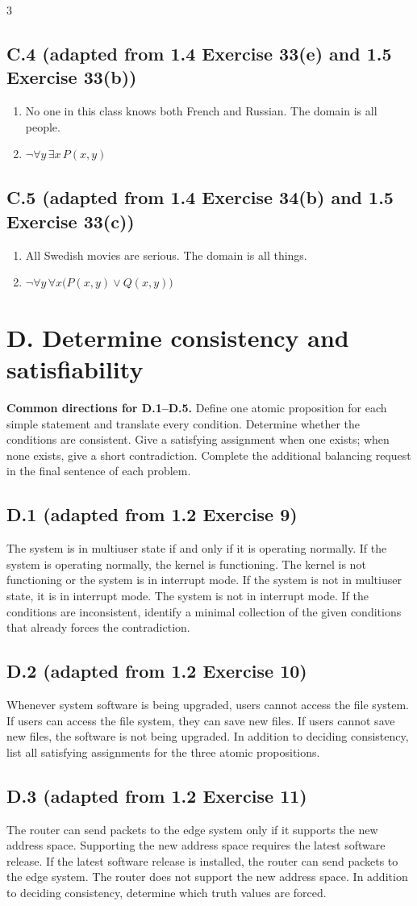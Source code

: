 \documentclass{article}
\newcommand{\problem}[2]{%
  \par
  \subsection*{#1 {\normalfont\footnotesize (#2)}}%
}
\begin{document}
\begin{multicols}{3}
\problem{C.4}{adapted from 1.4 Exercise 33(e) and 1.5 Exercise 33(b)}
\begin{enumerate}[label=(\alph*)]
  \item No one in this class knows both French and Russian. The domain is all
        people.
  \item $\neg\forall y\,\exists x\,P(x,y)$
\end{enumerate}

\problem{C.5}{adapted from 1.4 Exercise 34(b) and 1.5 Exercise 33(c)}
\begin{enumerate}[label=(\alph*)]
  \item All Swedish movies are serious. The domain is all things.
  \item $\neg\forall y\,\forall x\bigl(P(x,y)\lor Q(x,y)\bigr)$
\end{enumerate}
\section*{D. Determine consistency and satisfiability}

\textbf{Common directions for D.1--D.5.} Define one atomic proposition for
each simple statement and translate every condition. Determine whether the
conditions are consistent. Give a satisfying assignment when one exists; when
none exists, give a short contradiction. Complete the additional balancing
request in the final sentence of each problem.

\problem{D.1}{adapted from 1.2 Exercise 9}
The system is in multiuser state if and only if it is operating normally. If
the system is operating normally, the kernel is functioning. The kernel is not
functioning or the system is in interrupt mode. If the system is not in
multiuser state, it is in interrupt mode. The system is not in interrupt mode.
If the conditions are inconsistent, identify a minimal collection of the given
conditions that already forces the contradiction.

\problem{D.2}{adapted from 1.2 Exercise 10}
Whenever system software is being upgraded, users cannot access the file
system. If users can access the file system, they can save new files. If users
cannot save new files, the software is not being upgraded. In addition to
deciding consistency, list all satisfying assignments for the three atomic
propositions.

\columnbreak
\problem{D.3}{adapted from 1.2 Exercise 11}
The router can send packets to the edge system only if it supports the new
address space. Supporting the new address space requires the latest software
release. If the latest software release is installed, the router can send
packets to the edge system. The router does not support the new address space.
In addition to deciding consistency, determine which truth values are forced.


\end{multicols}
\end{document}
